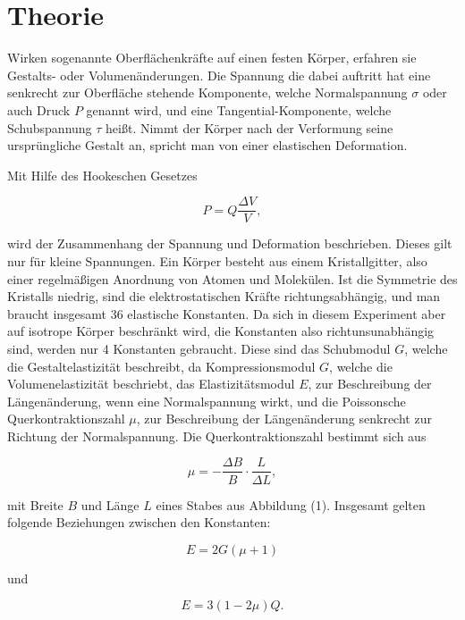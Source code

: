 \section{Theorie}
\label{sec:Theorie}

\cite{sample}

Wirken sogenannte Oberflächenkräfte auf einen festen Körper,
erfahren sie Gestalts- oder Volumenänderungen. Die Spannung
die dabei auftritt hat eine senkrecht zur Oberfläche stehende Komponente, welche
Normalspannung $\sigma$ oder auch Druck $P$ genannt wird, und
eine Tangential-Komponente, welche Schubspannung $\tau$ heißt.
Nimmt der Körper nach der Verformung seine ursprüngliche Gestalt an, spricht
man von einer elastischen Deformation. 

Mit Hilfe des Hookeschen Gesetzes

\begin{equation}
  P = Q \frac{\Delta V}{V} ,
\end{equation}


wird der Zusammenhang  der Spannung und Deformation beschrieben.
Dieses gilt nur für kleine Spannungen. 
Ein Körper besteht aus einem Kristallgitter, also einer regelmäßigen Anordnung von Atomen und Molekülen.
Ist die Symmetrie des Kristalls niedrig, sind die elektrostatischen Kräfte richtungsabhängig, und man braucht insgesamt 36 elastische Konstanten.
Da sich in diesem Experiment aber auf isotrope Körper beschränkt wird, die Konstanten also richtunsunabhängig sind, werden nur 4 Konstanten gebraucht.
Diese sind das Schubmodul $G$, welche die Gestaltelastizität beschreibt,
da Kompressionsmodul $G$, welche die Volumenelastizität beschriebt, das Elastizitätsmodul $E$, zur 
Beschreibung der Längenänderung, wenn eine Normalspannung wirkt, und die Poissonsche Querkontraktionszahl $\mu$, zur Beschreibung der 
Längenänderung senkrecht zur Richtung der Normalspannung.
Die Querkontraktionszahl bestimmt sich aus

\begin{equation}
  \mu = - \frac{\Delta B}{B}\cdot \frac{L}{\Delta L} ,
\end{equation}

mit Breite $B$ und Länge $L$ eines Stabes aus Abbildung (1).
Insgesamt gelten folgende Beziehungen zwischen den Konstanten:

\begin{equation}
  E = 2G(\mu + 1) 
\end{equation}

und

\begin{equation}
  E = 3 (1-2\mu)Q .
\end{equation}

